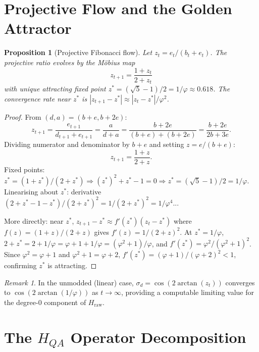 \documentclass[11pt]{article}
\newtheorem{proposition}[theorem]{Proposition}
\theoremstyle{definition}
\theoremstyle{remark}
\newtheorem{remark}[theorem]{Remark}
\newcommand{\hraw}{H_{\mathrm{raw}}}
\begin{document}
\section{Projective Flow and the Golden Attractor}
\label{sec:projective}

\begin{proposition}[Projective Fibonacci flow]
\label{prop:projective}
Let $z_t=e_t/(b_t+e_t)$.  The projective ratio evolves by the M\"{o}bius map
\[
  z_{t+1} = \frac{1+z_t}{2+z_t}
\]
with unique attracting fixed point $z^*=(\sqrt{5}-1)/2=1/\varphi\approx 0.618$.
The convergence rate near $z^*$ is $|z_{t+1}-z^*|\approx|z_t-z^*|/\varphi^2$.
\end{proposition}

\begin{proof}
From $(d,a)=(b+e,b+2e)$:
\[
  z_{t+1}=\frac{e_{t+1}}{d_{t+1}+e_{t+1}}=\frac{a}{d+a}
  =\frac{b+2e}{(b+e)+(b+2e)}=\frac{b+2e}{2b+3e}.
\]
Dividing numerator and denominator by $b+e$ and setting $z=e/(b+e)$:
\[
  z_{t+1}=\frac{1+z}{2+z}.
\]
Fixed points: $z^*=(1+z^*)/(2+z^*)\Rightarrow (z^*)^2+z^*-1=0\Rightarrow
z^*=(\sqrt{5}-1)/2=1/\varphi$.  Linearising about $z^*$: derivative
$(2+z^*-1-z^*)/(2+z^*)^2=1/(2+z^*)^2=1/\varphi^4$...

More directly: near $z^*$, $z_{t+1}-z^*\approx f'(z^*)(z_t-z^*)$ where
$f(z)=(1+z)/(2+z)$ gives $f'(z)=1/(2+z)^2$.  At $z^*=1/\varphi$,
$2+z^*=2+1/\varphi=\varphi+1+1/\varphi=({\varphi^2+1})/\varphi$, and
$f'(z^*)=\varphi^2/(\varphi^2+1)^2$.
Since $\varphi^2=\varphi+1$ and $\varphi^2+1=\varphi+2$,
$f'(z^*)=(\varphi+1)/(\varphi+2)^2<1$, confirming $z^*$ is attracting.
\end{proof}

\begin{remark}
In the unmodded (linear) case, $\sigma_d=\cos(2\arctan(z_t))$ converges to
$\cos(2\arctan(1/\varphi))$ as $t\to\infty$, providing a computable limiting
value for the degree-0 component of $\hraw$.
\end{remark}

\section{The $H_{QA}$ Operator Decomposition}
\label{sec:hqa}
\end{document}
